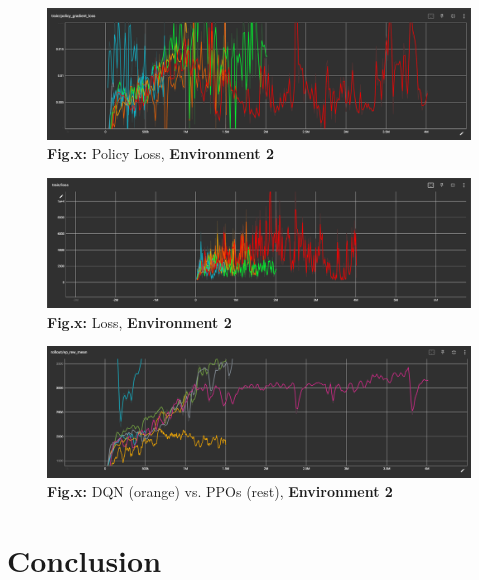 \documentclass{article}
\numberwithin{equation}{section}
\numberwithin{equation}{section}
\begin{document}
\begin{figure}[H]
	\centering
\includegraphics[scale=3,width=\linewidth]{policy_loss_env2.png}
	\\	
	\vspace{0.1in}
	\textbf{Fig.x:} Policy Loss, \textbf{Environment 2}
	\\
	\label{fig:Fig.3}
\end{figure}


\begin{figure}[H]
	\centering
\includegraphics[scale=3,width=\linewidth]{loss_env2.png}
	\\	
	\vspace{0.1in}
	\textbf{Fig.x:} Loss, \textbf{Environment 2}
	\\
	\label{fig:Fig.3}
\end{figure}



\begin{figure}[H]
	\centering
\includegraphics[scale=3,width=\linewidth]{dqn_vs_ppo_env2.png}
	\\	
	\vspace{0.1in}
	\textbf{Fig.x:} DQN (orange) vs. PPOs (rest), \textbf{Environment 2}
	\\
	\label{fig:Fig.3}
\end{figure}






\section*{Conclusion}

\end{document}
